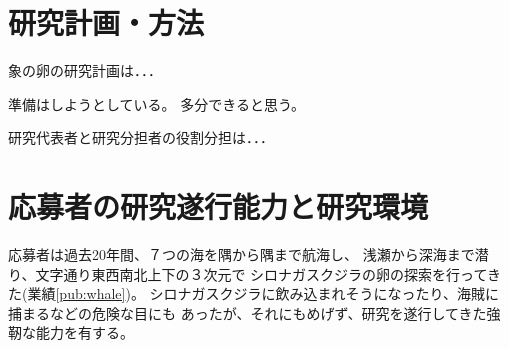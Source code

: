 \documentclass[11pt,a4j,dvipdfmx]{jarticle} 					%
\newcommand{\研究課題名}{象の卵}
\newcommand{\研究機関名}{逢坂大学}
\newcommand{\研究代表者氏名}{湯川秀樹}
\newcommand{\研究期間の最終元号年度}{8}  %
\begin{document}



\section{研究計画・方法}

	象の卵の研究計画は．．．

	準備はしようとしている。
	多分できると思う。

	研究代表者と研究分担者の役割分担は．．．

		




\section{応募者の研究遂行能力と研究環境}

	応募者は過去20年間、７つの海を隅から隅まで航海し、
	浅瀬から深海まで潜り、文字通り東西南北上下の３次元で
	シロナガスクジラの卵の探索を行ってきた(業績\ref{pub:whale})。
	シロナガスクジラに飲み込まれそうになったり、海賊に捕まるなどの危険な目にも
	あったが、それにもめげず、研究を遂行してきた強靭な能力を有する。

\PapersInstructions	%



\end{document}
